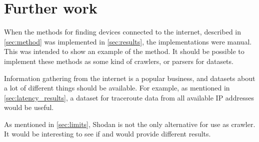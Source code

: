 \section{Further work} \label{sec:further_work}
When the methods for finding devices connected to the internet, described in \cref{sec:method} was implemented in \cref{sec:results}, the implementations were manual. This was intended to show an example of the method. It should be possible to implement these methods as some kind of crawlers, or parsers for datasets.

Information gathering from the internet is a popular business, and datasets about a lot of different things should be available. For example, as mentioned in \cref{sec:latency_results}, a dataset for traceroute data from all available IP addresses would be useful. 

As mentioned in \cref{sec:limits}, Shodan is not the only alternative for use as crawler. It would be interesting to see if \href{https://censys.io/}{\color{blue}{Censys}}\cite{censys} and \href{www.zoomeye.org}{\color{blue}{ZoomEye}}\cite{zoomeye} would provide different results.
